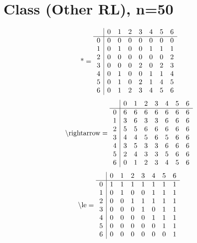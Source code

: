 \documentclass[11pt]{article}
\begin{document}
\section{Class (Other RL), n=50}
\[\text{*} = 
\begin{array}{r | r r r r r r r}
 & 0 & 1 & 2 & 3 & 4 & 5 & 6 \\ \hline
0 & 0 & 0 & 0 & 0 & 0 & 0 & 0 \\
1 & 0 & 1 & 0 & 0 & 1 & 1 & 1 \\
2 & 0 & 0 & 0 & 0 & 0 & 0 & 2 \\
3 & 0 & 0 & 0 & 2 & 0 & 2 & 3 \\
4 & 0 & 1 & 0 & 0 & 1 & 1 & 4 \\
5 & 0 & 1 & 0 & 2 & 1 & 4 & 5 \\
6 & 0 & 1 & 2 & 3 & 4 & 5 & 6 \\
\end{array}
\]
\[\text{\textbackslash rightarrow} = 
\begin{array}{r | r r r r r r r}
 & 0 & 1 & 2 & 3 & 4 & 5 & 6 \\ \hline
0 & 6 & 6 & 6 & 6 & 6 & 6 & 6 \\
1 & 3 & 6 & 3 & 3 & 6 & 6 & 6 \\
2 & 5 & 5 & 6 & 6 & 6 & 6 & 6 \\
3 & 4 & 4 & 5 & 6 & 5 & 6 & 6 \\
4 & 3 & 5 & 3 & 3 & 6 & 6 & 6 \\
5 & 2 & 4 & 3 & 3 & 5 & 6 & 6 \\
6 & 0 & 1 & 2 & 3 & 4 & 5 & 6 \\
\end{array}
\]
\[\text{\textbackslash le} = 
\begin{array}{r | r r r r r r r}
 & 0 & 1 & 2 & 3 & 4 & 5 & 6 \\ \hline
0 & 1 & 1 & 1 & 1 & 1 & 1 & 1 \\
1 & 0 & 1 & 0 & 0 & 1 & 1 & 1 \\
2 & 0 & 0 & 1 & 1 & 1 & 1 & 1 \\
3 & 0 & 0 & 0 & 1 & 0 & 1 & 1 \\
4 & 0 & 0 & 0 & 0 & 1 & 1 & 1 \\
5 & 0 & 0 & 0 & 0 & 0 & 1 & 1 \\
6 & 0 & 0 & 0 & 0 & 0 & 0 & 1 \\
\end{array}
\]
\end{document}
